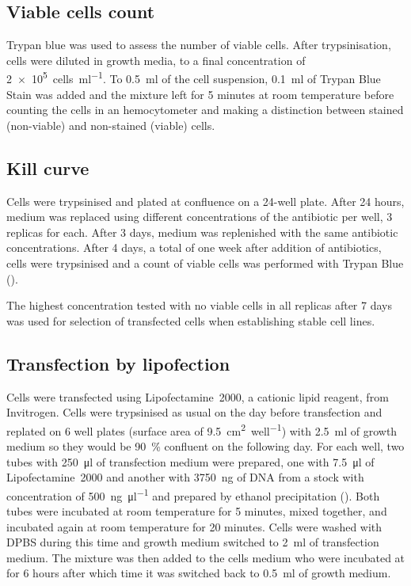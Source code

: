     \subsection{Viable cells count}
      \label{sec:methods:trypan-blue}
      Trypan blue was used to assess the number of viable cells.
      After trypsinisation, cells were diluted in growth media,
      to a final concentration of \SI{2e5}{cells\per\ml}.
      To \SI{0.5}{\ml} of the cell suspension, \SI{0.1}{\ml} of 
      Trypan Blue Stain was added and the mixture left for 5 minutes
      at room temperature before counting
      the cells in an hemocytometer and making a distinction between
      stained (non-viable) and non-stained (viable) cells.

    \subsection{Kill curve}
      \label{sec:methods:kill-curve}
      Cells were trypsinised and plated at  confluence on
      a 24-well plate. After 24 hours, medium was replaced using different
      concentrations of the antibiotic per well, 3 replicas for each.
      After 3 days, medium was replenished
      with the same antibiotic concentrations. After 4 days, a total of
      one week after addition of antibiotics, cells were trypsinised and a count
      of viable cells was performed with
      Trypan Blue ().

      The highest concentration tested with no viable cells in all
      replicas after 7 days was used for selection of transfected
      cells when establishing stable cell lines.

    \subsection{Transfection by lipofection}
      \label{methods:lipofection}
      Cells were transfected using Lipofectamine~2000, a cationic lipid
      reagent, from Invitrogen. Cells were trypsinised as usual on the
      day before transfection and replated on 6 well plates (surface area
      of \SI{9.5}{\square\cm\per well}) with \SI{2.5}{\ml} of growth
      medium so they would be \SI{90}{\percent} confluent on the following
      day. For each well, two tubes with \SI{250}{\ul} of transfection
      medium were prepared, one with \SI{7.5}{\ul} of Lipofectamine~2000
      and another with \SI{3750}{\ng} of DNA from a stock with concentration
      of \SI{500}{\ng\per\ul} and prepared by ethanol precipitation
      ().
      Both tubes were incubated at room temperature for 5 minutes,
      mixed together, and incubated again at room temperature for 20 minutes. Cells
      were washed with DPBS during this time and growth medium switched to \SI{2}{\ml}
      of transfection medium. The mixture was then added to the cells medium who
      were incubated at  for 6 hours after which time it was switched back to
      \SI{0.5}{\ml} of growth medium.

